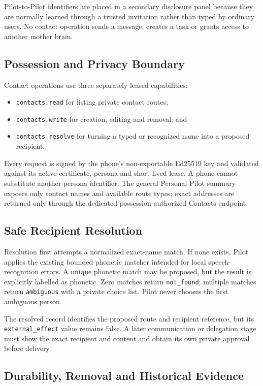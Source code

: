 Pilot-to-Pilot identifiers are placed in a secondary disclosure panel because they are normally
learned through a trusted invitation rather than typed by ordinary users.  No contact operation
sends a message, creates a task or grants access to another mother brain.

\subsection{Possession and Privacy Boundary}

Contact operations use three separately leased capabilities:
\begin{itemize}
  \item \texttt{contacts.read} for listing private contact routes;
  \item \texttt{contacts.write} for creation, editing and removal; and
  \item \texttt{contacts.resolve} for turning a typed or recognized name into a proposed recipient.
\end{itemize}

Every request is signed by the phone's non-exportable Ed25519 key and validated against its active
certificate, persona and short-lived lease.  A phone cannot substitute another persona identifier.
The general Personal Pilot summary exposes only contact names and available route types; exact
addresses are returned only through the dedicated possession-authorized Contacts endpoint.

\subsection{Safe Recipient Resolution}

Resolution first attempts a normalized exact-name match.  If none exists, Pilot applies the
existing bounded phonetic matcher intended for local speech-recognition errors.  A unique phonetic
match may be proposed, but the result is explicitly labelled as phonetic.  Zero matches return
\texttt{not\_found}; multiple matches return \texttt{ambiguous} with a private choice list.  Pilot
never chooses the first ambiguous person.

The resolved record identifies the proposed route and recipient reference, but its
\texttt{external\_effect} value remains false.  A later communication or delegation stage must show the exact
recipient and content and obtain its own private approval before delivery.

\subsection{Durability, Removal and Historical Evidence}

